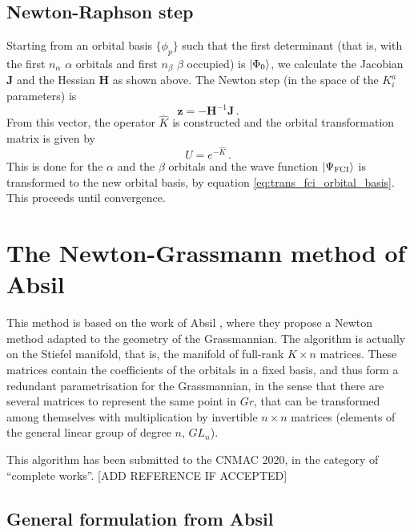 \subsection{Newton-Raphson step}
Starting from an orbital basis $\{\phi_p\}$ such that the first determinant (that is, with the first $n_\alpha$ $\alpha$ orbitals and first $n_\beta$ $\beta$ occupied) is $\ket{\Phi_0}$, we calculate the Jacobian $\mathbf{J}$ and the Hessian $\mathbf{H}$ as shown above.
The Newton step (in the space of the $K_i^a$ parameters) is
\begin{equation}
  \mathbf{z} = -\mathbf{H}^{-1} \mathbf{J}\,.
\end{equation}
From this vector, the operator $\hat{K}$ is constructed and the orbital transformation matrix is given by
\begin{equation}
  U = e^{-\hat{K}}\,.
\end{equation}
This is done for the $\alpha$ and the $\beta$ orbitals and the wave function $\ket{\Psi_\text{FCI}}$ is transformed to the new orbital basis, by equation \eqref{eq:trans_fci_orbital_basis}.
This proceeds until convergence.


\newpage
\section{The Newton-Grassmann method of Absil}

This method is based on the work of Absil \etal{}, where they propose a Newton method adapted to the geometry of the Grassmannian.
The algorithm is actually on the Stiefel manifold, that is, the manifold of full-rank $K \times n$ matrices.
These matrices contain the coefficients of the orbitals in a fixed basis, and thus form a redundant parametrisation for the Grassmannian, in the sense that there are several matrices to represent the same point in $Gr$, that can be transformed among themselves with multiplication by invertible $n \times n$ matrices (elements of the general linear group of degree $n$, $GL_n$).

This algorithm has been submitted to the CNMAC 2020, in the category of ``complete works''. [ADD REFERENCE IF ACCEPTED]

\subsection{General formulation from Absil}

